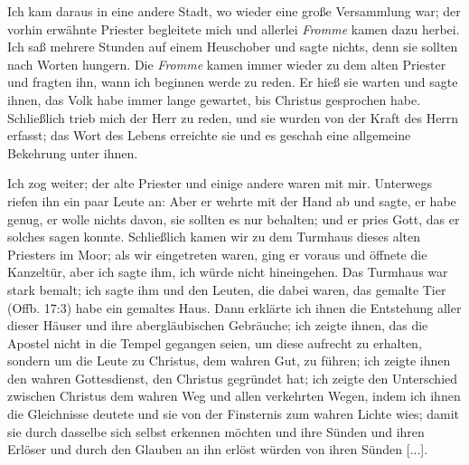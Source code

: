 Ich kam daraus in eine andere Stadt, wo wieder eine große
Versammlung war; der vorhin erwähnte Priester begleitete mich
und allerlei \textit{Fromme} kamen dazu herbei. Ich saß mehrere
Stunden auf einem Heuschober und sagte 
nichts, denn sie sollten
nach Worten hungern. Die \textit{Fromme} kamen immer wieder
zu dem alten Priester und fragten ihn, wann ich beginnen werde
zu reden. Er hieß sie warten und sagte ihnen, das Volk habe
immer lange gewartet, bis Christus gesprochen habe. Schließlich
trieb mich der Herr zu reden, und sie wurden von der Kraft des
Herrn erfasst; das Wort des Lebens erreichte sie und es geschah
eine allgemeine Bekehrung unter ihnen.


Ich zog weiter; der alte Priester und einige andere waren
mit mir. Unterwegs riefen ihn ein paar Leute an: 
 Aber er wehrte mit der Hand ab und sagte, er habe genug,
er wolle nichts davon, sie sollten es nur behalten; und er pries
Gott, das er solches sagen konnte. Schließlich kamen wir zu dem
Turmhaus dieses alten Priesters im Moor; als wir eingetreten
waren, ging er voraus und öffnete die Kanzeltür, aber ich sagte ihm,
ich würde nicht hineingehen. Das Turmhaus war stark bemalt;
ich sagte ihm und den Leuten, die dabei waren, das gemalte Tier
(Offb. 17:3) habe ein gemaltes 
Haus. Dann erklärte ich ihnen die
Entstehung aller dieser Häuser und ihre abergläubischen Gebräuche;
ich zeigte ihnen, das die Apostel nicht in die Tempel gegangen
seien, um diese aufrecht zu erhalten, sondern um die Leute zu
Christus, dem wahren Gut, zu führen; ich zeigte ihnen den wahren
Gottesdienst, den Christus 
gegründet hat; ich zeigte den Unterschied 
zwischen Christus dem wahren Weg und allen verkehrten
Wegen, indem ich ihnen die Gleichnisse deutete und sie von der
Finsternis zum wahren Lichte wies; damit sie durch dasselbe sich
selbst erkennen möchten und ihre Sünden und ihren Erlöser und
durch den Glauben an ihn erlöst würden von ihren Sünden [...].


